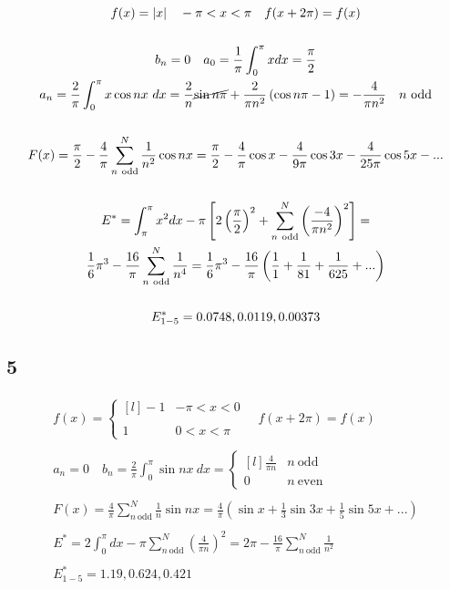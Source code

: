 \begin{gather*}
	f(x) = \left|
		x
	\right|
	\quad
	-\pi < x < \pi
	\quad
	f(x + 2 \pi) = f(x)
	\\
	\\
	b_n = 0
	\quad
	a_0 = \frac{1}{\pi} \int_0^\pi{x dx} = \frac{\pi}{2}
	\\
	a_n = \frac{2}{\pi} \int_0^\pi{x \cos{n x}\ dx} =
	\frac{2}{n} \cancel{\sin{n \pi}} + \frac{2}{\pi n^2} \left(
		\cos{n \pi} - 1
	\right) =
	-\frac{4}{\pi n^2} \quad n\ \text{odd}
	\\
	\\
	F(x) = \frac{\pi}{2} - \frac{4}{\pi} \sum_{n\ \text{odd}}^N{\frac{1}{n^2} \cos{n x}} =
	\frac{\pi}{2} - \frac{4}{\pi} \cos{x} - \frac{4}{9 \pi} \cos{3 x} - \frac{4}{25 \pi} \cos{5 x} - ...
	\\
	\\
	E^* = \int_{\pi}^\pi{x^2 dx} - \pi \left[
		2 \left(
			\frac{\pi}{2}
		\right)^2
		+ \sum_{n\ \text{odd}}^N{\left(
			\frac{-4}{\pi n^2}
		\right)^2}
	\right] =
	\\
	\frac{1}{6}\pi^3 - \frac{16}{\pi} \sum_{n\ \text{odd}}^N{\frac{1}{n^4}} =
	\frac{1}{6}\pi^3 - \frac{16}{\pi} \left(
		\frac{1}{1} + \frac{1}{81} + \frac{1}{625} + ...
	\right)
	\\
	\\
	E_{1-5}^* = 0.0748, 0.0119, 0.00373
\end{gather*}


\subsection*{5}


\begin{gather*}
	f(x) = \left\{
		\begin{matrix*}[l]
			-1	& -\pi < x < 0 \\ \\
			1	& 0 < x < \pi
		\end{matrix*}
	\right. \quad
	f(x + 2 \pi) = f(x)
	\\
	\\
	a_n = 0
	\quad
	b_n = \frac{2}{\pi} \int_0^\pi{\sin{n x}\ dx} = \left\{
		\begin{matrix*}[l]
			\frac{4}{\pi n}	& n\ \text{odd} \\
			0				& n\ \text{even}
		\end{matrix*}
	\right.
	\\
	\\
	F(x) = \frac{4}{\pi} \sum_{n\ \text{odd}}^N{\frac{1}{n} \sin{n x}} =
	\frac{4}{\pi} \left(
		\sin{x} + \frac{1}{3} \sin{3 x} + \frac{1}{5} \sin{5 x} + ...
	\right)
	\\
	\\
	E^* = 2 \int_0^\pi{dx} - \pi \sum_{n\ \text{odd}}^N{\left(
		\frac{4}{\pi n}
	\right)^2} = 
	2 \pi - \frac{16}{\pi} \sum_{n\ \text{odd}}^N{\frac{1}{n^2}}
	\\
	\\
	E_{1-5}^* = 1.19, 0.624, 0.421
\end{gather*}


